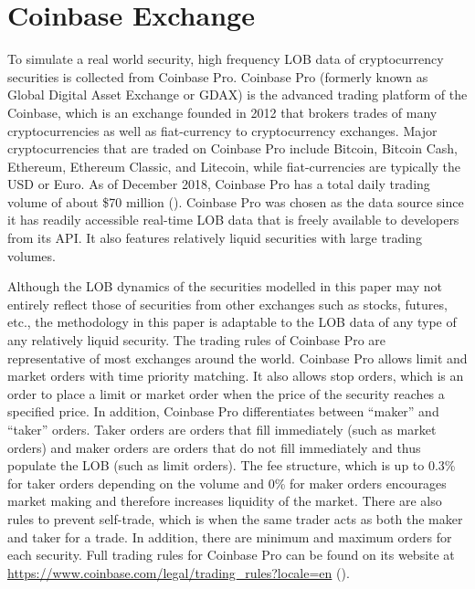 \section{Coinbase Exchange}

To simulate a real world security, high frequency LOB data of cryptocurrency securities is collected from Coinbase Pro. Coinbase Pro (formerly known as Global Digital Asset Exchange or GDAX) is the advanced trading platform of the Coinbase, which is an exchange founded in 2012 that brokers trades of many cryptocurrencies as well as fiat-currency to cryptocurrency exchanges. Major cryptocurrencies that are traded on Coinbase Pro include Bitcoin, Bitcoin Cash, Ethereum, Ethereum Classic, and Litecoin, while fiat-currencies are typically the USD or Euro. As of December 2018, Coinbase Pro has a total daily trading volume of about \$70 million (\cite{L1}). Coinbase Pro was chosen as the data source since it has readily accessible real-time LOB data that is freely available to developers from its API. It also features relatively liquid securities with large trading volumes. 

Although the LOB dynamics of the securities modelled in this paper may not entirely reflect those of securities from other exchanges such as stocks, futures, etc., the methodology in this paper is adaptable to the LOB data of any type of any relatively liquid security. The trading rules of Coinbase Pro are representative of most exchanges around the world. Coinbase Pro allows limit and market orders with time priority matching. It also allows stop orders, which is an order to place a limit or market order when the price of the security reaches a specified price. In addition, Coinbase Pro differentiates between “maker” and “taker” orders. Taker orders are orders that fill immediately (such as market orders) and maker orders are orders that do not fill immediately and thus populate the LOB (such as limit orders). The fee structure, which is up to 0.3\% for taker orders depending on the volume and 0\% for maker orders encourages market making and therefore increases liquidity of the market. There are also rules to prevent self-trade, which is when the same trader acts as both the maker and taker for a trade. In addition, there are minimum and maximum orders for each security. Full trading rules for Coinbase Pro can be found on its website at \url{https://www.coinbase.com/legal/trading_rules?locale=en} (\cite{L2}).

